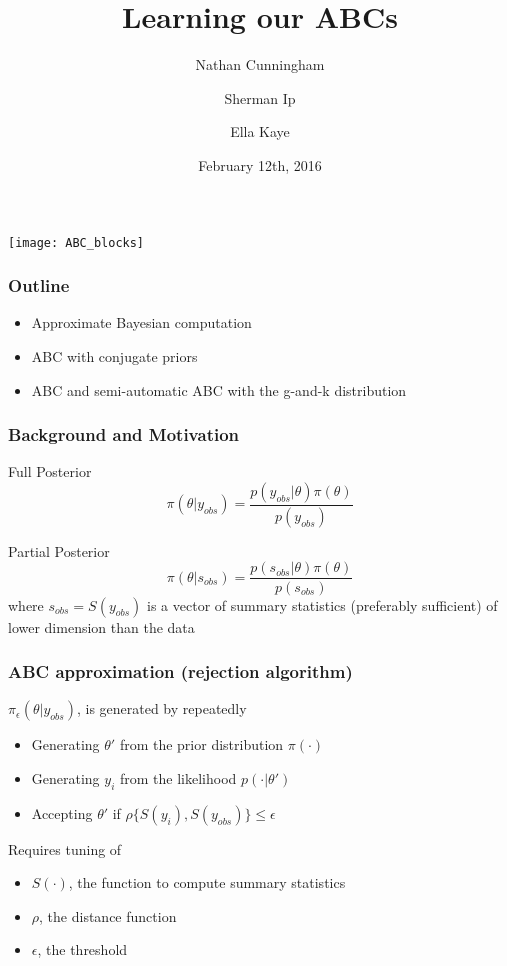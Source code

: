 \documentclass{beamer}
\title{Learning our ABCs}
\author{Nathan Cunningham \and Sherman Ip \and Ella Kaye}
\date{February 12th, 2016}
\begin{document}
\begin{frame}
\maketitle
\centering
\texttt{[image: ABC\_blocks]}
\end{frame}

\begin{frame}
\frametitle{Outline}
\begin{itemize}
\item Approximate Bayesian computation
\item ABC with conjugate priors
\item ABC and semi-automatic ABC with the g-and-k distribution
\end{itemize}
\end{frame}

\begin{frame}
\frametitle{Background and Motivation}
\begin{block}{Full Posterior}
\[
\pi(\theta | y_{obs}) = \frac{p(y_{obs} | \theta) \pi(\theta)}{p(y_{obs})}
\]
\end{block}
\pause
\begin{block}{Partial Posterior}
\[
\pi(\theta | s_{obs}) = \frac{p(s_{obs} | \theta) \pi(\theta)}{p(s_{obs})}
\]
where $s_{obs} = S(y_{obs})$ is a vector of summary statistics (preferably sufficient) of lower dimension than the data
\end{block}
\end{frame}

\begin{frame}
\frametitle{ABC approximation (rejection algorithm)}
$\pi_{\epsilon}(\theta | y_{obs})$, is generated by repeatedly

\begin{itemize}
\item Generating $\theta'$ from the prior distribution $\pi(\cdot)$
\item Generating $y_i$ from the likelihood $p(\cdot | \theta')$
\item Accepting $\theta'$ if $\rho\{S(y_i), S(y_{obs})\} \leq \epsilon$
\end{itemize}
\pause
Requires tuning of 
\begin{itemize}
\item $S(\cdot)$, the function to compute summary statistics
\item $\rho$, the distance function
\item $\epsilon$, the threshold
\end{itemize}
\end{frame}
\end{document}
